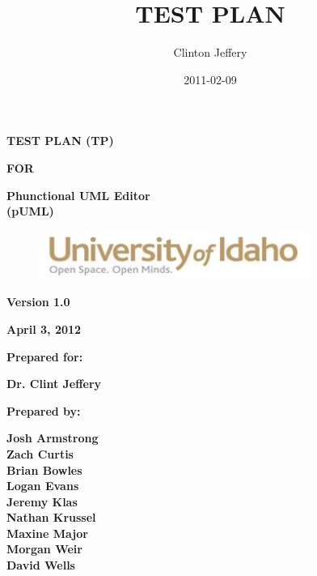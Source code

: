 \documentclass[twoside,letterpaper]{article}
\title{TEST PLAN}
\author{Clinton Jeffery}
\date{2011-02-09}
\begin{document}
\clearpage\setcounter{page}{1}\pagestyle{Standard}
\thispagestyle{FirstPage}

{\centering\bfseries
TEST PLAN (TP)
\par}

{\centering\bfseries
FOR
\par}


\bigskip

{\centering\bfseries
Phunctional UML Editor
\\(pUML)
\par}


\bigskip


\bigskip


\bigskip

{\centering \par}

\begin{figure}
\centering
\includegraphics[width=3.5in]{uidahologo.jpg}
\end{figure}

\bigskip


\bigskip


\bigskip


\bigskip


{\centering\bfseries
Version 1.0
\par}

{\centering\bfseries
April 3, 2012
\par}


\bigskip


\bigskip

{\centering\bfseries
Prepared for:
\par}

{\centering\bfseries
Dr. Clint Jeffery
\par}


\bigskip



{\centering\bfseries
Prepared by:
\par}

{\centering\bfseries
Josh Armstrong
\\Zach Curtis
\\Brian Bowles
\\Logan Evans
\\Jeremy Klas
\\Nathan Krussel
\\Maxine Major
\\Morgan Weir
\\David Wells
\par}
\end{document}
